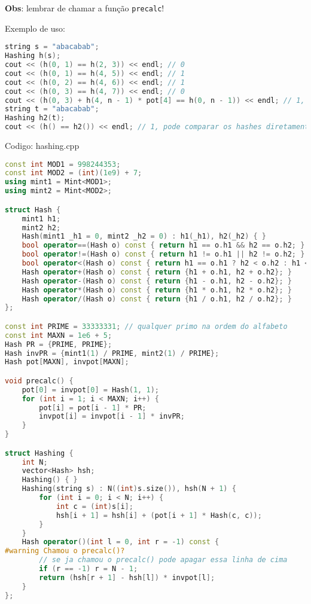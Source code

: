 \documentclass[10pt, a4paper, oneside]{book}
\begin{document}
\textbf{Obs}: lembrar de chamar a função \texttt{precalc}!



Exemplo de uso:



\begin{lstlisting}[language=C++]
string s = "abacabab";
Hashing h(s);
cout << (h(0, 1) == h(2, 3)) << endl; // 0
cout << (h(0, 1) == h(4, 5)) << endl; // 1
cout << (h(0, 2) == h(4, 6)) << endl; // 1
cout << (h(0, 3) == h(4, 7)) << endl; // 0
cout << (h(0, 3) + h(4, n - 1) * pot[4] == h(0, n - 1)) << endl; // 1, da pra shiftar o hash
string t = "abacabab";
Hashing h2(t);
cout << (h() == h2()) << endl; // 1, pode comparar os hashes diretamente
\end{lstlisting}

\hfill

Codigo: hashing.cpp

\begin{lstlisting}[language=C++]
const int MOD1 = 998244353;
const int MOD2 = (int)(1e9) + 7;
using mint1 = Mint<MOD1>;
using mint2 = Mint<MOD2>;

struct Hash {
    mint1 h1;
    mint2 h2;
    Hash(mint1 _h1 = 0, mint2 _h2 = 0) : h1(_h1), h2(_h2) { }
    bool operator==(Hash o) const { return h1 == o.h1 && h2 == o.h2; }
    bool operator!=(Hash o) const { return h1 != o.h1 || h2 != o.h2; }
    bool operator<(Hash o) const { return h1 == o.h1 ? h2 < o.h2 : h1 < o.h1; }
    Hash operator+(Hash o) const { return {h1 + o.h1, h2 + o.h2}; }
    Hash operator-(Hash o) const { return {h1 - o.h1, h2 - o.h2}; }
    Hash operator*(Hash o) const { return {h1 * o.h1, h2 * o.h2}; }
    Hash operator/(Hash o) const { return {h1 / o.h1, h2 / o.h2}; }
};

const int PRIME = 33333331; // qualquer primo na ordem do alfabeto
const int MAXN = 1e6 + 5;
Hash PR = {PRIME, PRIME};
Hash invPR = {mint1(1) / PRIME, mint2(1) / PRIME};
Hash pot[MAXN], invpot[MAXN];

void precalc() {
    pot[0] = invpot[0] = Hash(1, 1);
    for (int i = 1; i < MAXN; i++) {
        pot[i] = pot[i - 1] * PR;
        invpot[i] = invpot[i - 1] * invPR;
    }
}

struct Hashing {
    int N;
    vector<Hash> hsh;
    Hashing() { }
    Hashing(string s) : N((int)s.size()), hsh(N + 1) {
        for (int i = 0; i < N; i++) {
            int c = (int)s[i];
            hsh[i + 1] = hsh[i] + (pot[i + 1] * Hash(c, c));
        }
    }
    Hash operator()(int l = 0, int r = -1) const {
#warning Chamou o precalc()?
        // se ja chamou o precalc() pode apagar essa linha de cima
        if (r == -1) r = N - 1;
        return (hsh[r + 1] - hsh[l]) * invpot[l];
    }
};
\end{lstlisting}
\hfill
\end{document}
